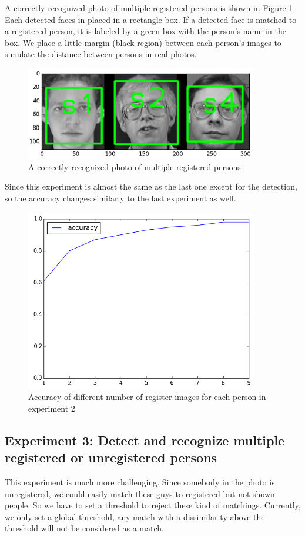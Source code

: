 \documentclass[paper=a4, fontsize=11pt]{scrartcl} %
\numberwithin{equation}{section} %
\numberwithin{figure}{section} %
\numberwithin{table}{section} %
\begin{document}
A correctly recognized photo of multiple registered persons is shown in Figure \ref{fig:rec_multi_reg}.  Each detected faces in placed in a rectangle box. If a detected face is matched to a registered person, it is labeled by a green box with the person's name in the box. We place a little margin (black region) between each person's images to simulate the distance between persons in real photos.

\begin{figure}[!htbp]
	\centering
	\includegraphics[width=4in]{rec_multi_reg.png}
	\caption{A correctly recognized photo of multiple registered persons}
	\label{fig:rec_multi_reg}
\end{figure}

Since this experiment is almost the same as the last one except for the detection, so the accuracy changes similarly to the last experiment as well. 

\begin{figure}[!htbp]
	\centering
	\includegraphics[width=4in]{acc_multi_reg.png}
	\caption{Accuracy of different number of register images for each person in experiment 2}
	\label{fig:acc_multi_reg}
\end{figure}

\subsection{Experiment 3: Detect and recognize multiple registered or unregistered persons}
This experiment is much more challenging. Since somebody in the photo is unregistered, we could easily match these guys to registered but not shown people. So we have to set a threshold to reject these kind of matchings. Currently, we only set a global threshold, any match with a dissimilarity above the threshold will not be considered as a match.
\end{document}
